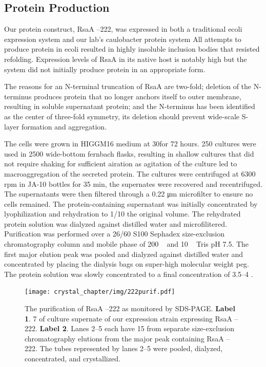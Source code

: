 \subsection{Protein Production}
\label{sub:crystal-protein-production}

Our protein construct, RsaA --222, was expressed in both a traditional
\ac{ecoli} expression system and our lab's \ac{caulobacter}
protein system
 All attempts to produce protein in \ac{ecoli}
resulted in highly insoluble inclusion bodies that resisted
refolding. Expression levels of RsaA in its native host is notably high but
the system did not initially produce protein in an appropriate form.

The reasons for an N-terminal truncation of RsaA are two-fold; deletion
of the N-terminus produces protein that no longer anchors itself to
outer membrane, resulting in soluble supernatant protein; and the
N-terminus has been identified as the center of three-fold symmetry, its
deletion should prevent wide-scale \ac{S-layer} formation and aggregation.

The cells were grown in HIGGM16 medium
at 30\cel for 72 hours. 250 \millilitre cultures
were used in 2500 \millilitre wide-bottom fernbach flasks, resulting in shallow
cultures that did not require shaking for sufficient airation as
agitation of the culture led to macroaggregation of the secreted
protein. The cultures were centrifuged at 6300 rpm in JA-10 bottles for
35 min, the supernates were recovered and recentrifuged. The
supernatants were then filtered through a 0.22 \si{\micro\meter} microfilter to ensure
no cells remained. The protein-containing supernatant was initially
concentrated by lyophilization and rehydration to 1/10 the original
volume. The rehydrated protein solution was dialyzed against distilled
water and microfilitered. Purification was performed over a 26/60 S100
Sephadex size-exclusion chromatography column and mobile phase of 200 \si{\milli\molar}  and 10 \si{\milli\molar}
Tris pH 7.5. The first major elution peak was pooled and dialyzed
against distilled water and concentrated by placing the dialysis bags on
super-high molecular weight \ac{peg}. The protein
solution was slowly concentrated to a final concentration of 3.5--4
\mgperml.

\begin{figure}[htb]
  	\begin{center}
   		\texttt{[image: crystal\_chapter/img/222purif.pdf]}
   	\end{center}
   	\caption[Purification of RsaA --222 shown by \ac{SDS-PAGE}]{
      The purification of RsaA --222 as monitored by \ac{SDS-PAGE}. \textbf{Label 1}. 7 \microlitre{} of culture supernate of our \caulobacter{} expression strain expressing RsaA --222. \textbf{Label 2}. Lanes 2--5 each have 15 \microlitre{} from separate  size-exclusion chromatography elutions from the major peak containing RsaA --222. The tubes represented by lanes 2--5 were pooled, dialyzed, concentrated, and crystallized.
}
   	\label{fig:222purif}
\end{figure}   

